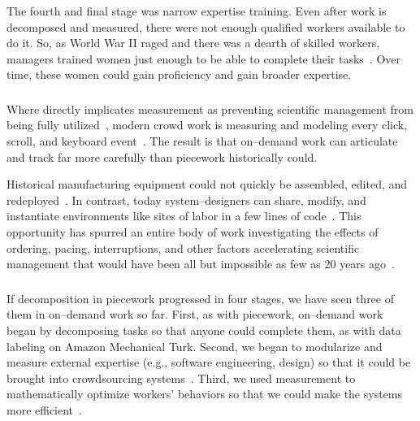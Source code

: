 \documentclass[trackingWork]{subfiles}
\begin{document}
The fourth and final stage was narrow expertise training. 
Even after work is decomposed and measured, there were not enough qualified workers available to do it. 
So, as World War II raged and there was a dearth of skilled workers, managers trained women just enough to be able to complete their tasks~\cite{hart2013rise}. 
Over time, these women could gain proficiency and gain broader expertise.



\subsubsection{\whatchanged}
\begin{comment}
outline
	- measurement is more precise,
  so decomposition is deeper
	- not a single position,
  but a marketplace
\end{comment}

Where \citeauthor{10.2307/23702539} directly implicates measurement as
preventing scientific management from being fully utilized~\cite{10.2307/23702539},
modern crowd work is measuring and modeling every click,
scroll,
and keyboard event~\cite{rzeszotarski2011instrumenting,rzeszotarski2012crowdscape}.
The result is that on--demand work can articulate and track far more carefully than piecework historically could.


Historical manufacturing equipment could not quickly be assembled,
edited,
and redeployed~\cite{hu1961parallel}.
In contrast,
today system--designers can share,
modify,
and instantiate environments
like sites of labor in a few lines of code~\cite{lessig2006code,turkitLittle}.
This opportunity has spurred an entire body of work investigating the effects of
ordering,
pacing,
interruptions,
and
other factors accelerating scientific management that would have been
all but impossible as few as 20 years ago~\cite{dai2015and,Cai:2016:CRI:2858036.2858237,cheng2015break,measuringCrowdsourcingCheng,embracingErrorKrishna}.


\subsubsection{\implication}
If decomposition in piecework progressed in four stages, we have seen three of them in on--demand work so far.
First, as with piecework, on--demand work began by decomposing tasks so that anyone could complete them, as with data labeling on Amazon Mechanical Turk.
Second, we began to modularize and measure external expertise (e.g., software engineering, design) so that it could be brought into crowdsourcing systems~\cite{foundry,Chen2016}.
Third, we used measurement to mathematically optimize workers' behaviors so that we could make the systems more efficient~\cite{weld2010decision}.
\end{document}
